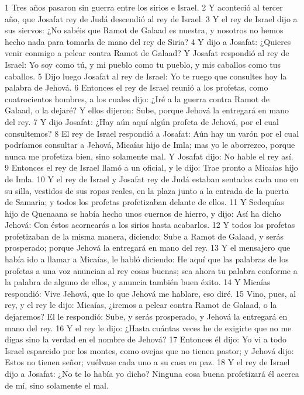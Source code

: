 1 Tres años pasaron sin guerra entre los sirios e Israel.
2 Y aconteció al tercer año, que Josafat rey de Judá descendió al rey de Israel.
3 Y el rey de Israel dijo a sus siervos: ¿No sabéis que Ramot de Galaad es nuestra, y nosotros no hemos hecho nada para tomarla de mano del rey de Siria?
4 Y dijo a Josafat: ¿Quieres venir conmigo a pelear contra Ramot de Galaad? Y Josafat respondió al rey de Israel: Yo soy como tú, y mi pueblo como tu pueblo, y mis caballos como tus caballos.
5 Dijo luego Josafat al rey de Israel: Yo te ruego que consultes hoy la palabra de Jehová.
6 Entonces el rey de Israel reunió a los profetas, como cuatrocientos hombres, a los cuales dijo: ¿Iré a la guerra contra Ramot de Galaad, o la dejaré? Y ellos dijeron: Sube, porque Jehová la entregará en mano del rey.
7 Y dijo Josafat: ¿Hay aún aquí algún profeta de Jehová, por el cual consultemos?
8 El rey de Israel respondió a Josafat: Aún hay un varón por el cual podríamos consultar a Jehová, Micaías hijo de Imla; mas yo le aborrezco, porque nunca me profetiza bien, sino solamente mal. Y Josafat dijo: No hable el rey así.
9 Entonces el rey de Israel llamó a un oficial, y le dijo: Trae pronto a Micaías hijo de Imla.
10 Y el rey de Israel y Josafat rey de Judá estaban sentados cada uno en su silla, vestidos de sus ropas reales, en la plaza junto a la entrada de la puerta de Samaria; y todos los profetas profetizaban delante de ellos.
11 Y Sedequías hijo de Quenaana se había hecho unos cuernos de hierro, y dijo: Así ha dicho Jehová: Con éstos acornearás a los sirios hasta acabarlos.
12 Y todos los profetas profetizaban de la misma manera, diciendo: Sube a Ramot de Galaad, y serás prosperado; porque Jehová la entregará en mano del rey.
13 Y el mensajero que había ido a llamar a Micaías, le habló diciendo: He aquí que las palabras de los profetas a una voz anuncian al rey cosas buenas; sea ahora tu palabra conforme a la palabra de alguno de ellos, y anuncia también buen éxito.
14 Y Micaías respondió: Vive Jehová, que lo que Jehová me hablare, eso diré.
15 Vino, pues, al rey, y el rey le dijo: Micaías, ¿iremos a pelear contra Ramot de Galaad, o la dejaremos? El le respondió: Sube, y serás prosperado, y Jehová la entregará en mano del rey.
16 Y el rey le dijo: ¿Hasta cuántas veces he de exigirte que no me digas sino la verdad en el nombre de Jehová?
17 Entonces él dijo: Yo vi a todo Israel esparcido por los montes, como ovejas que no tienen pastor; y Jehová dijo: Estos no tienen señor; vuélvase cada uno a su casa en paz.
18 Y el rey de Israel dijo a Josafat: ¿No te lo había yo dicho? Ninguna cosa buena profetizará él acerca de mí, sino solamente el mal.
